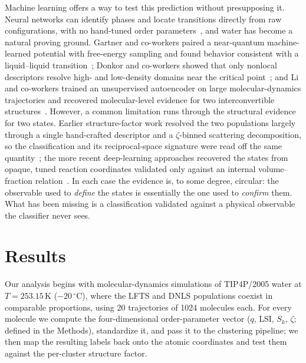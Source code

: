 \documentclass[aps, amsmath,amssymb, reprint, twocolumn, superscriptaddress]{revtex4-2}
\begin{document}
Machine learning offers a way to test this prediction without presupposing it. Neural networks can identify phases and locate transitions directly from raw configurations, with no hand-tuned order parameters~\cite{carrasquilla_machine_2017}, and water has become a natural proving ground. Gartner and co-workers paired a near-quantum machine-learned potential with free-energy sampling and found behavior consistent with a liquid--liquid transition~\cite{gartner_signatures_2020}; Donkor and co-workers showed that only nonlocal descriptors resolve high- and low-density domains near the critical point~\cite{donkor_beyond_2024}; and Li and co-workers trained an unsupervised autoencoder on large molecular-dynamics trajectories and recovered molecular-level evidence for two interconvertible structures~\cite{li_evidence_2026}. However, a common limitation runs through the structural evidence for two states. Earlier structure-factor work resolved the two populations largely through a single hand-crafted descriptor and a $\zeta$-binned scattering decomposition, so the classification and its reciprocal-space signature were read off the same quantity~\cite{shi_direct_2020}; the more recent deep-learning approaches recovered the states from opaque, tuned reaction coordinates validated only against an internal volume--fraction relation~\cite{li_evidence_2026}. In each case the evidence is, to some degree,
circular: the observable used to \emph{define} the states is essentially the one used to \emph{confirm} them. What has been missing is a classification validated against a physical observable the classifier never sees.

\FloatBarrier


\section{Results}
Our analysis begins with molecular-dynamics simulations of TIP4P/2005 water at $T = 253.15\,\mathrm{K}$ ($-20\,^\circ$C), where the LFTS and DNLS populations coexist in comparable proportions, using 20 trajectories of 1024 molecules each. For every molecule we compute the four-dimensional order-parameter vector ($q$, LSI, $S_k$, $\zeta$; defined in the Methods), standardize it, and pass it to the clustering pipeline; we then map the resulting labels back onto the atomic coordinates and test them against the per-cluster structure factor.
\end{document}
